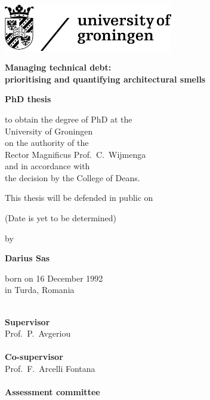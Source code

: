 \pagestyle{empty}
\thispagestyle{empty}

\large
\vspace*{-3cm}

\hspace*{-0.5cm}\includegraphics[width=7.38cm]{Figures/rugr_logoen_zwart_rgb.jpg}

\begin{center}

\vspace{1cm}

{\fontsize{29pt}{34.8pt}\selectfont \textbf{Managing technical debt:}\\\textbf{prioritising and quantifying architectural smells}}


\vspace{2.5cm}

\textbf{\Large{PhD thesis}}

\vspace{1.6cm}

to obtain the degree of PhD at the\\
University of Groningen\\
on the authority of the\\
Rector Magnificus Prof.\ C.~Wijmenga\\
and in accordance with\\
the decision by the College of Deans.

\vspace{0.4cm}

This thesis will be defended in public on

\vspace{0.4cm}

(Date is yet to be determined)

\vspace{1cm}

by

\vspace{1cm}

\textbf{\Large{Darius Sas}}\\

\vspace{0.4cm}

born on 16 December 1992\\
in Turda, Romania
\end{center}


\clearpage
\thispagestyle{empty}
\noindent
\\
\textbf{Supervisor}\\
Prof.\ P.\ Avgeriou\\

\noindent
\\
\textbf{Co-supervisor}\\
Prof.\ F.\ Arcelli Fontana\\

\noindent
\\
\textbf{Assessment committee}\\

\vfill
\normalsize

